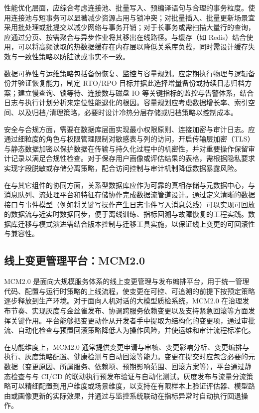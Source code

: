 性能优化层面，应综合考虑连接池、批量写入、预编译语句与合理的事务粒度。使用连接池与短事务可以显著减少资源占用与锁冲突；对批量插入、批量更新场景宜采用批处理或批提交以减少网络与事务开销；对于长事务或需扫描大量行的查询，应通过分页、按需聚合与异步作业将其移出在线路径。与缓存（如 Redis）结合使用，可以将高频读取的热数据缓存在内存层以降低关系库负载，同时需设计缓存失效与一致性策略以防脏读或事实不一致。

数据可靠性与运维策略包括备份恢复、监控与容量规划。应定期执行物理与逻辑备份并验证恢复能力，制定 RTO/RPO 目标并据此选择增量备份或持续日志归档方案；建立慢查询、锁等待、连接数与磁盘 IO 等关键指标的监控与告警体系，结合日志与执行计划分析来定位性能退化的根因。容量规划应考虑数据增长率、索引空间、以及归档/清理策略，必要时设计冷热分层存储或归档策略以控制成本。

安全与合规方面，需要在数据库层面实现最小权限原则、连接加密与审计日志。应通过细粒度的角色与权限管理限制对敏感表与列的访问，开启传输层加密（TLS）与静态数据加密以保护数据在传输与持久化过程中的机密性，并对重要操作保留审计记录以满足合规性检查。对于保存用户画像或评估结果的表格，需根据隐私要求实现字段脱敏或存储分离策略，配合访问控制与审计机制降低数据暴露风险。

在与其它组件的协同方面，关系型数据库应作为可靠的真相存储与元数据中心，与消息队列、流处理平台和特征存储协作完成数据流管道设计。通过定义清晰的数据接口与事件模型（例如将关键写操作产生日志事件写入消息总线）可以实现可回放的数据流与近实时数据同步，便于离线训练、指标回溯与故障恢复的工程实践。数据库迁移与模式演进需结合版本控制与迁移工具实施，以保证线上变更的可回滚性与兼容性。

\subsection{线上变更管理平台：MCM2.0}
MCM2.0 是面向大规模服务体系的线上变更管理与发布编排平台，用于统一管理代码、配置与运行时策略的上线流程，使变更在可控、可追溯的前提下按预定策略逐步释放到生产环境。对于面向人机对话的大模型质检系统，MCM2.0 在治理发布节奏、实现灰度与金丝雀发布、协调跨服务依赖变更以及支持紧急回滚等方面发挥关键作用。平台能够把变更动作从开发者手中提取为结构化的变更项，通过审批流、自动化检查与预置回滚策略降低人为操作风险，并使运维和审计流程标准化\cite{https://doi.org/10.1002/smr.2433}。

在功能维度上，MCM2.0 通常提供变更申请与审核、变更影响分析、变更编排与执行、灰度策略配置、健康检测与自动回滚等能力\cite{9838750}。变更在提交时应包含必要的元数据（变更原因、所属服务、依赖项、预期影响范围、回滚方案等），平台通过静态检查与与 CI/CD 的联动执行预发布验证与自动化测试。灰度发布与流量分流策略可以精细配置到用户维度或场景维度，以支持在有限样本上验证评估器、模型路由或画像更新的实际效果，并通过与监控系统联动在指标异常时自动执行回退操作。

